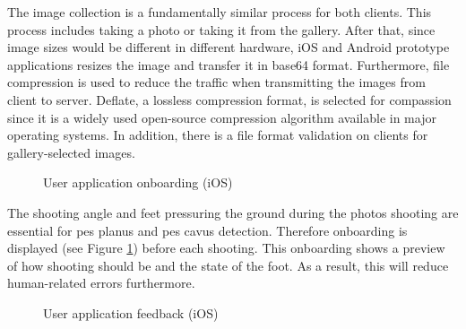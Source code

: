 The image collection is a fundamentally similar process for both clients. This process includes taking a photo or taking it from the gallery. After that, since image sizes would be different in different hardware, iOS and Android prototype applications resizes the image and transfer it in base64 format. Furthermore, file compression is used to reduce the traffic when transmitting the images from client to server. Deflate, a lossless compression format, is selected for compassion since it is a widely used open-source compression algorithm available in major operating systems. In addition, there is a file format validation on clients for gallery-selected images. 

\begin{figure}[htbp]
\centering
{}
\caption{User application onboarding (iOS)}
\label{fig:UserApplicationOnboarding}
\end{figure}

The shooting angle and feet pressuring the ground during the photos shooting are essential for pes planus and pes cavus detection. Therefore onboarding is displayed (see Figure \ref{fig:UserApplicationOnboarding}) before each shooting. This onboarding shows a preview of how shooting should be and the state of the foot. As a result, this will reduce human-related errors furthermore. 

\begin{figure}[htbp]
\centering
{}
\caption{User application feedback (iOS)}
\label{fig:UserApplicationFeedback}
\end{figure}

